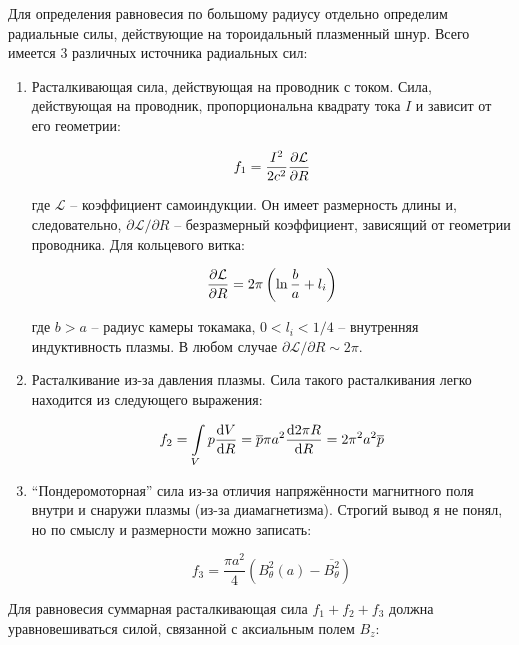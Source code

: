 \documentclass[10pt, a4paper]{article}
\begin{document}
Для определения равновесия по большому радиусу отдельно определим радиальные силы, действующие на тороидальный плазменный шнур. Всего имеется 3 различных источника радиальных сил:

\begin{enumerate}
	
   \item Расталкивающая сила, действующая на проводник с током. Сила, действующая на проводник, пропорциональна квадрату тока $I$ и зависит от его геометрии:
   
   \begin{equation*}
      f_1 = \frac{I^2}{2c^2} \pdv{\mathcal{L}}{R}
   \end{equation*}

   где $\mathcal{L}$ -- коэффициент самоиндукции. Он имеет размерность длины и, следовательно, $\partial\mathcal{L}/\partial R$ -- безразмерный коэффициент, зависящий от геометрии проводника. Для кольцевого витка:
   
   \begin{equation*}
      \pdv{\mathcal{L}}{R} = 2\pi \left( \ln\frac{b}{a} + l_i \right)
   \end{equation*}

   где $b>a$ -- радиус камеры токамака, $0<l_i<1/4$ -- внутренняя индуктивность плазмы. В любом случае $\partial\mathcal{L}/\partial R\sim 2\pi$.

   \item Расталкивание из-за давления плазмы. Сила такого расталкивания легко находится из следующего выражения:
   
   \begin{equation*}
      f_2 = \int\limits_{V} p \dv{V}{R} = \overline{p} \pi a^2 \dv{2\pi R}{R} = 2\pi^2 a^2 \overline{p}
   \end{equation*}

   \item ``Пондеромоторная'' сила из-за отличия напряжённости магнитного поля внутри и снаружи плазмы (из-за диамагнетизма). Строгий вывод я не понял, но по смыслу и размерности можно записать:
   
   \begin{equation*}
      f_3 = \frac{\pi a^2}{4}\left( B_\theta^2(a) - \overline{B_\theta^2} \right)
   \end{equation*}

\end{enumerate}

Для равновесия суммарная расталкивающая сила $f_1+f_2+f_3$ должна уравновешиваться силой, связанной с аксиальным полем $B_z$:
\end{document}
